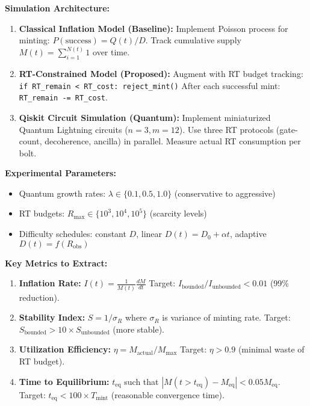 \documentclass[a4paper,10.5pt,twoside]{article}
\begin{document}
\textbf{Simulation Architecture:}
\begin{enumerate}
    \item \textbf{Classical Inflation Model (Baseline):}  
    Implement Poisson process for minting: $P(\text{success}) = Q(t)/D$.  
    Track cumulative supply $M(t) = \sum_{i=1}^{N(t)} 1$ over time.
    
    \item \textbf{RT-Constrained Model (Proposed):}  
    Augment with RT budget tracking:  
    \texttt{if RT\_remain < RT\_cost: reject\_mint()}  
    After each successful mint: \texttt{RT\_remain -= RT\_cost}.
    
    \item \textbf{Qiskit Circuit Simulation (Quantum):}  
    Implement miniaturized Quantum Lightning circuits ($n=3, m=12$).  
    Use three RT protocols (gate-count, decoherence, ancilla) in parallel.  
    Measure actual RT consumption per bolt.
\end{enumerate}

\textbf{Experimental Parameters:}
\begin{itemize}
    \item Quantum growth rates: $\lambda \in \{0.1, 0.5, 1.0\}$ (conservative to aggressive)
    \item RT budgets: $R_{\max} \in \{10^3, 10^4, 10^5\}$ (scarcity levels)
    \item Difficulty schedules: constant $D$, linear $D(t) = D_0 + \alpha t$, adaptive $D(t) = f(R_{\text{obs}})$
\end{itemize}

\textbf{Key Metrics to Extract:}
\begin{enumerate}
    \item \textbf{Inflation Rate:} $I(t) = \frac{1}{M(t)} \frac{dM}{dt}$  
    Target: $I_{\text{bounded}} / I_{\text{unbounded}} < 0.01$ (99\% reduction).
    
    \item \textbf{Stability Index:} $S = 1 / \sigma_R$ where $\sigma_R$ is variance of minting rate.  
    Target: $S_{\text{bounded}} > 10 \times S_{\text{unbounded}}$ (more stable).
    
    \item \textbf{Utilization Efficiency:} $\eta = M_{\text{actual}} / M_{\max}$  
    Target: $\eta > 0.9$ (minimal waste of RT budget).
    
    \item \textbf{Time to Equilibrium:} $t_{\text{eq}}$ such that $|M(t > t_{\text{eq}}) - M_{\text{eq}}| < 0.05 M_{\text{eq}}$.  
    Target: $t_{\text{eq}} < 100 \times T_{\text{mint}}$ (reasonable convergence time).
\end{enumerate}
\end{document}
